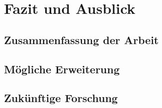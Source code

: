 \section{Fazit und Ausblick}
\subsection{Zusammenfassung der Arbeit}
\subsection{Mögliche Erweiterung}
\subsection{Zukünftige Forschung}